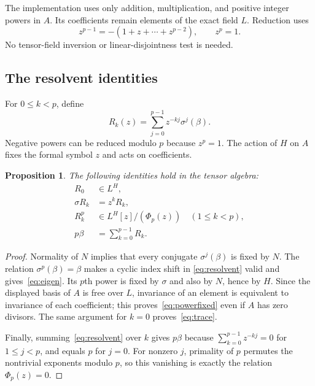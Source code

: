 \documentclass[11pt]{article}
\newtheorem{proposition}[theorem]{Proposition}
\theoremstyle{definition}\newtheorem{definition}[theorem]{Definition}
\theoremstyle{remark}\newtheorem{remark}[theorem]{Remark}
\begin{document}
The implementation uses only addition, multiplication, and positive integer
powers in $A$. Its coefficients remain elements of the exact field $L$.
Reduction uses
\begin{equation}
 z^{p-1}=-(1+z+\cdots+z^{p-2}),\qquad z^p=1.
\end{equation}
No tensor-field inversion or linear-disjointness test is needed.

\subsection{The resolvent identities}

For $0\le k<p$, define
\begin{equation}\label{eq:resolvent}
 R_k(z)=\sum_{j=0}^{p-1}z^{-kj}\sigma^j(\beta).
\end{equation}
Negative powers can be reduced modulo $p$ because $z^p=1$. The action of $H$
on $A$ fixes the formal symbol $z$ and acts on coefficients.

\begin{proposition}\label{prop:descent}
The following identities hold in the tensor algebra:
\begin{align}
 R_0&\in L^H,\label{eq:trace}\\
 \sigma R_k&=z^kR_k,\label{eq:eigen}\\
 R_k^p&\in L^H[z]/(\Phi_p(z))\quad(1\le k<p),\label{eq:powerfixed}\\
 p\beta&=\sum_{k=0}^{p-1}R_k.\label{eq:inverseDFT}
\end{align}
\end{proposition}
\begin{proof}
Normality of $N$ implies that every conjugate $\sigma^j(\beta)$ is fixed by
$N$. The relation $\sigma^p(\beta)=\beta$ makes a cyclic index shift in
\eqref{eq:resolvent} valid and gives~\eqref{eq:eigen}. Its $p$th power is
fixed by $\sigma$ and also by $N$, hence by $H$. Since the displayed basis of
$A$ is free over $L$, invariance of an element is equivalent to invariance of
each coefficient; this proves~\eqref{eq:powerfixed} even if $A$ has zero divisors.
The same argument for $k=0$ proves~\eqref{eq:trace}.

Finally, summing~\eqref{eq:resolvent} over $k$ gives $p\beta$ because
$\sum_{k=0}^{p-1}z^{-kj}=0$ for $1\le j<p$, and equals $p$ for $j=0$.
For nonzero $j$, primality of $p$ permutes the nontrivial exponents modulo $p$,
so this vanishing is exactly the relation $\Phi_p(z)=0$.
\end{proof}
\end{document}
